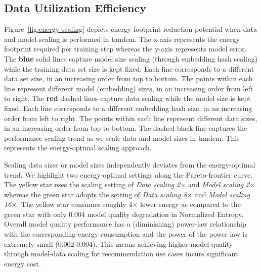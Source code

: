 \documentclass{IEEEtran}
\begin{document}
\subsection{Data Utilization Efficiency}
\label{sec:appendix-data-efficiency}

Figure~\ref{fig:energy-scaling} depicts energy footprint reduction potential when data and model scaling is performed in tandem. The x-axis represents the energy footprint required per training step whereas the y-axis represents model error. 
The \textbf{blue} solid lines capture model size scaling (through embedding hash scaling) while the training data set size is kept fixed. 
Each line corresponds to a different data set size, in an increasing order from top to bottom.
The points within each line represent different model (embedding) sizes, in an increasing order from left to right. 
The \textbf{red} dashed lines capture data scaling while the model size is kept fixed. 
Each line corresponds to a different embedding hash size, in an increasing order from left to right.
The points within each line represent different data sizes, in an increasing order from top to bottom. 
The dashed black line captures the performance scaling trend as we scale data and model sizes in tandem. This represents the energy-optimal scaling approach.

Scaling data sizes or model sizes independently deviates from the energy-optimal trend.
We highlight two energy-optimal settings along the Pareto-frontier curve.
The yellow star uses the scaling setting of \textit{Data scaling 2$\times$} and \textit{Model scaling 2$\times$} whereas the green star adopts the setting of \textit{Data scaling 8$\times$} and \textit{Model scaling 16$\times$}.
The yellow star consumes roughly 4$\times$ lower energy as compared to the green star with only 0.004 model quality degradation in Normalized Entropy. 
Overall model quality performance has a (diminishing) power-law relationship with the corresponding energy consumption and the power of the power law is extremely small (0.002-0.004). This means achieving higher model quality through model-data scaling for recommendation use cases incurs significant energy cost.

\end{document}
